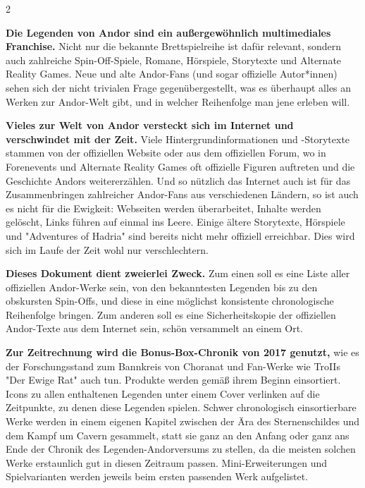 \documentclass[10pt, a4paper, oneside]{book}
\begin{document}
\begin{multicols}{2}

\textbf{Die Legenden von Andor sind ein außergewöhnlich multimediales Franchise.} Nicht nur die bekannte Brettspielreihe ist dafür relevant, sondern auch zahlreiche Spin-Off-Spiele, Romane, Hörspiele, Storytexte und Alternate Reality Games. Neue und alte Andor-Fans (und sogar offizielle Autor*innen) sehen sich der nicht trivialen Frage gegenübergestellt, was es überhaupt alles an Werken zur Andor-Welt gibt, und in welcher Reihenfolge man jene erleben will.\bigskip

\textbf{Vieles zur Welt von Andor versteckt sich im Internet und verschwindet mit der Zeit.} Viele Hintergrundinformationen und -Storytexte stammen von der offiziellen Website oder aus dem offiziellen Forum, wo in Forenevents und Alternate Reality Games oft offizielle Figuren auftreten und die Geschichte Andors weitererzählen. Und so nützlich das Internet auch ist für das Zusammenbringen zahlreicher Andor-Fans aus verschiedenen Ländern, so ist auch es nicht für die Ewigkeit: Webseiten werden überarbeitet, Inhalte werden gelöscht, Links führen auf einmal ins Leere. Einige ältere Storytexte, Hörspiele und "Adventures of Hadria" sind bereits nicht mehr offiziell erreichbar. Dies wird sich im Laufe der Zeit wohl nur verschlechtern.\bigskip

\textbf{Dieses Dokument dient zweierlei Zweck.} 
Zum einen soll es eine Liste aller offiziellen Andor-Werke sein, von den bekanntesten Legenden bis zu den obskursten Spin-Offs, und diese in eine möglichst konsistente chronologische Reihenfolge bringen.
Zum anderen soll es eine Sicherheitskopie der offiziellen Andor-Texte aus dem Internet sein, schön versammelt an einem Ort.\bigskip

\textbf{Zur Zeitrechnung wird die Bonus-Box-Chronik von 2017 genutzt,} wie es der Forschungsstand zum Bannkreis von Choranat und Fan-Werke wie TroIIs "Der Ewige Rat" auch tun. Produkte werden gemäß ihrem Beginn einsortiert. Icons zu allen enthaltenen Legenden unter einem Cover verlinken auf die Zeitpunkte, zu denen diese Legenden spielen. Schwer chronologisch einsortierbare Werke werden in einem eigenen Kapitel zwischen der Ära des Sternenschildes und dem Kampf um Cavern gesammelt, statt sie ganz an den Anfang oder ganz ans Ende der Chronik des Legenden-Andorversums zu stellen, da die meisten solchen Werke erstaunlich gut in diesen Zeitraum passen. Mini-Erweiterungen und Spielvarianten werden jeweils beim ersten passenden Werk aufgelistet.\bigskip


\end{multicols}
\end{document}
